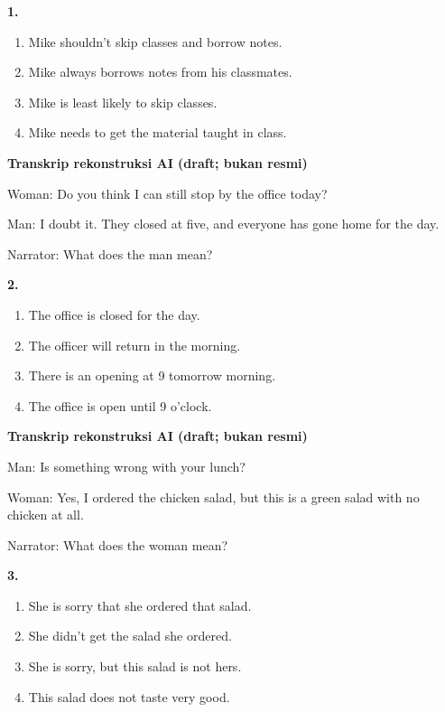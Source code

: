\documentclass[12pt]{article}
\begin{document}
\noindent\textbf{1.}
\begin{enumerate}[label=(\Alph*),leftmargin=*,itemsep=0.2em]
\item Mike shouldn't skip classes and borrow notes.
\item Mike always borrows notes from his classmates.
\item Mike is least likely to skip classes.
\item Mike needs to get the material taught in class.
\end{enumerate}
\par
\vspace{0.25\baselineskip}
\begin{exampleblock}
\textbf{Transkrip rekonstruksi AI (draft; bukan resmi)}\par
Woman: Do you think I can still stop by the office today?\par
Man: I doubt it. They closed at five, and everyone has gone home for the day.\par
Narrator: What does the man mean?\par
\end{exampleblock}
\noindent\textbf{2.}
\begin{enumerate}[label=(\Alph*),leftmargin=*,itemsep=0.2em]
\item The office is closed for the day.
\item The officer will return in the morning.
\item There is an opening at 9 tomorrow morning.
\item The office is open until 9 o'clock.
\end{enumerate}
\par
\vspace{0.25\baselineskip}
\begin{exampleblock}
\textbf{Transkrip rekonstruksi AI (draft; bukan resmi)}\par
Man: Is something wrong with your lunch?\par
Woman: Yes, I ordered the chicken salad, but this is a green salad with no chicken at all.\par
Narrator: What does the woman mean?\par
\end{exampleblock}
\noindent\textbf{3.}
\begin{enumerate}[label=(\Alph*),leftmargin=*,itemsep=0.2em]
\item She is sorry that she ordered that salad.
\item She didn't get the salad she ordered.
\item She is sorry, but this salad is not hers.
\item This salad does not taste very good.
\end{enumerate}
\end{document}
